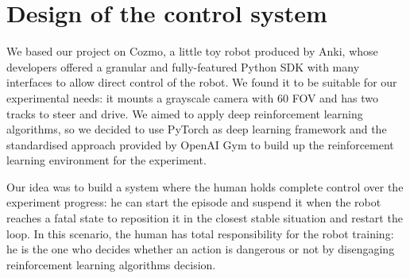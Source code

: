 \documentclass[10pt,twocolumn,letterpaper]{article}
\begin{document}

\section{Design of the control system}

We based our project on Cozmo, a little toy robot produced by Anki, whose developers offered a granular and fully-featured Python SDK with many interfaces to allow direct control of the robot.
We found it to be suitable for our experimental needs: it mounts a grayscale camera with 60 FOV and has two tracks to steer and drive.
We aimed to apply deep reinforcement learning algorithms, so we decided to use PyTorch as deep learning framework and the standardised approach provided by OpenAI Gym to build up the reinforcement learning environment for the experiment.

Our idea was to build a system where the human holds complete control over the experiment progress: he can start the episode and suspend it when the robot reaches a fatal state to reposition it in the closest stable situation and restart the loop.
In this scenario, the human has total responsibility for the robot training: he is the one who decides whether an action is dangerous or not by disengaging reinforcement learning algorithms decision.
\end{document}
